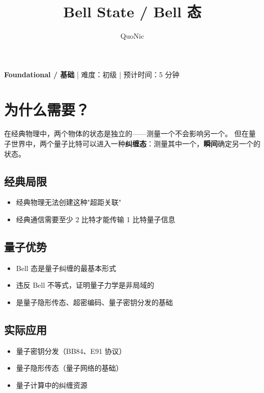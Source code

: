 \documentclass[12pt,a4paper]{article}
\title{Bell State / Bell 态}
\author{QuoNic}
\date{}
\begin{document}
\maketitle

\begin{center}
\textbf{Foundational / 基础} | 难度：初级 | 预计时间：5 分钟
\end{center}

\tableofcontents
\newpage

\section{为什么需要？}

在经典物理中，两个物体的状态是独立的——测量一个不会影响另一个。
但在量子世界中，两个量子比特可以进入一种\textbf{纠缠态}：测量其中一个，\textbf{瞬间}确定另一个的状态。

\subsection{经典局限}
\begin{itemize}
  \item 经典物理无法创建这种"超距关联"
  \item 经典通信需要至少 2 比特才能传输 1 比特量子信息
\end{itemize}

\subsection{量子优势}
\begin{itemize}
  \item Bell 态是量子纠缠的最基本形式
  \item 违反 Bell 不等式，证明量子力学是非局域的
  \item 是量子隐形传态、超密编码、量子密钥分发的基础
\end{itemize}

\subsection{实际应用}
\begin{itemize}
  \item 量子密钥分发（BB84、E91 协议）
  \item 量子隐形传态（量子网络的基础）
  \item 量子计算中的纠缠资源
\end{itemize}
\end{document}
